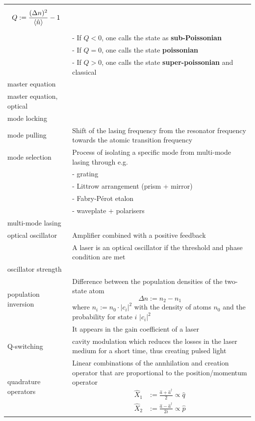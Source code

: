 \documentclass{article}
\begin{document}
\begin{xltabular}{\linewidth}{p{6cm}|X}
			$$Q := \frac{(\Delta n)^2}{\braket{\hat{n}}} - 1$$ \\
			& - If $Q<0$, one calls the state as \textbf{sub-Poissonian} \\
			& - If $Q=0$, one calls the state \textbf{poissonian} \\
			& - If $Q>0$, one calls the state \textbf{super-poissonian} and classical \\
	\hline
		master equation &  \\
	\hline
		master equation, optical &  \\
	\hline
		mode locking &  \\
	\hline
		mode pulling & Shift of the lasing frequency from the resonator frequency towards the atomic transition frequency \\
	\hline
		mode selection & Process of isolating a specific mode from multi-mode lasing through e.g.\\
		& - grating \\
		& - Littrow arrangement (prism + mirror) \\
		& - Fabry-Pérot etalon \\
		& - waveplate + polarisers \\
	\hline
		multi-mode lasing &  \\
	\hline
		optical oscillator & Amplifier combined with a positive feedback \\
		& A laser is an optical oscillator if the threshold and phase condition are met \\
	\hline
		oscillator strength &  \\
	\hline
		population inversion & Difference between the population densities of the two-state atom
			$$\Delta n := n_2 - n_1$$
		where $n_i := n_0 \cdot |c_i|^2$ with the density of atoms $n_0$ and the probability for state $i$ $|c_i|^2$\\
		& It appears in the gain coefficient of a laser\\
	\hline
		Q-switching & cavity modulation which reduces the losses in the laser medium for a short time, thus creating pulsed light \\
	\hline
		quadrature operators & Linear combinations of the annhilation and creation operator that are proportional to the position/momentum operator
			{
			\begin{align*}
				\hat{X}_1 &:= \frac{\hat{a} + \hat{a}^\dagger}{2} \propto \hat{q} \\
				\hat{X}_2 &:= \frac{\hat{a} - \hat{a}^\dagger}{2i} \propto \hat{p}
			\end{align*}
}
\end{xltabular}
\end{document}
